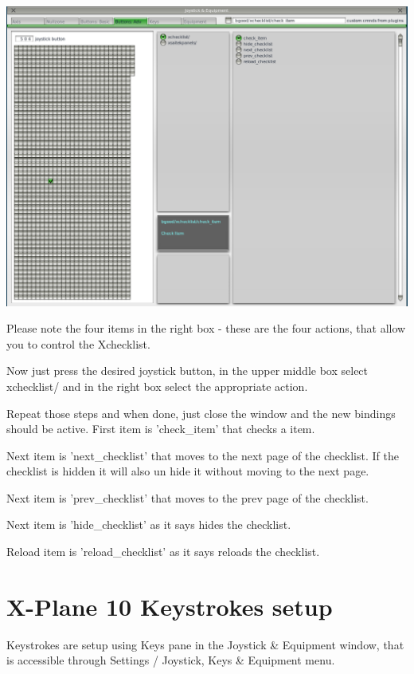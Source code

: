 \documentclass[11pt,parskip=half,a4paper]{scrartcl}
\begin{document}
\begin{center}
\includegraphics[width=17cm]{XchecklistUserManual-img001.png}
\end{center}

Please note the four items in the right box - these are the four actions, that allow you to control the Xchecklist. \newline

Now just press the desired joystick button, in the upper middle box select xchecklist/ and in the right 
box select the appropriate action. \newline

Repeat those steps and when done, just close the window and the new bindings should be active. 
First item is 'check\_item' that checks a item. 

\newpage
Next item is 'next\_checklist' that moves to the next page of the checklist. If the checklist is hidden it 
will also un hide it without moving to the next page. 

Next item is 'prev\_checklist' that moves to the prev page of the checklist.

Next item is 'hide\_checklist' as it says hides the checklist.

Reload item is 'reload\_checklist' as it says reloads the checklist.

\newpage
\section{X-Plane 10 Keystrokes setup}
Keystrokes are setup using Keys pane in the Joystick \& Equipment window, that is accessible through 
Settings / Joystick, Keys \& Equipment menu.
\end{document}
